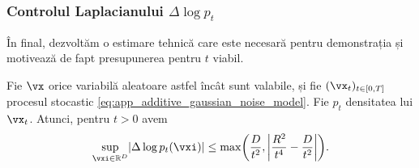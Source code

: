 \documentclass[../../book-main_ro.tex]{subfiles}
\begin{document}
\subsubsection{Controlul Laplacianului \(\Delta \log p_{t}\)}

În final, dezvoltăm o estimare tehnică care este necesară pentru demonstrația  și motivează de fapt presupunerea pentru \(t\) viabil.

\begin{lemma}\label{lem:app_diffusion_laplacian_control}
    Fie \(\vx\) orice variabilă aleatoare astfel încât  sunt valabile, și fie \((\vx_{t})_{t \in [0, T]}\) procesul stocastic \eqref{eq:app_additive_gaussian_noise_model}. Fie \(p_{t}\) densitatea lui \(\vx_{t}\). Atunci, pentru \(t > 0\) avem 
    \begin{equation}
        \sup_{\vxi \in \R^{D}}\abs{\Delta \log p_{t}(\vxi)} \leq \max\rp{\frac{D}{t^{2}}, \abs*{\frac{R^{2}}{t^{4}} - \frac{D}{t^{2}}}}.
    \end{equation}
\end{lemma}
\end{document}
